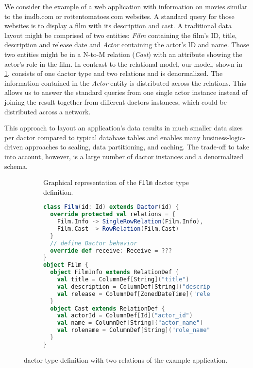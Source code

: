     We consider the example of a web application with information on movies similar to the imdb.com or rottentomatoes.com websites.
    A standard query for those websites is to display a film with its description and cast.
    A traditional data layout might be comprised of two entities: \textit{Film} containing the film's ID, title, description and release date and \textit{Actor} containing the actor's ID and name.
    Those two entities might be in a N-to-M relation (\textit{Cast}) with an attribute showing the actor's role in the film.
    In contrast to the relational model, our model, shown in \cref{fig:film_diagram}, consists of one \gls{dactor} type and two \glspl{relation} and is denormalized.
    The information contained in the \textit{Actor} entity is distributed across the  \glspl{relation}.
    This allows us to answer the standard queries from one single actor instance instead of joining the result together from different \glspl{dactor} instances, which could be distributed across a network.

    This approach to layout an application's data results in much smaller data sizes per \gls{dactor} compared to typical database tables and enables many business-logic-driven approaches to scaling, data partitioning, and caching.
    The trade-off to take into account, however, is a large number of \gls{dactor} instances and a denormalized schema.

    \begin{figure}
      \centering

      \begin{subfigure}[b]{0.44\textwidth}
        \centering
        
        \caption{Graphical representation of the \texttt{Film} \gls{dactor} type definition.}
        \label{fig:film_diagram}
      \end{subfigure}\hfill
      \begin{subfigure}[b]{0.54\textwidth}
        \centering
        \scriptsize
\begin{lstlisting}[language=Scala]
class Film(id: Id) extends Dactor(id) {
  override protected val relations = {
    Film.Info -> SingleRowRelation(Film.Info),
    Film.Cast -> RowRelation(Film.Cast)
  }
  // define Dactor behavior
  override def receive: Receive = ???
}
object Film {
  object FilmInfo extends RelationDef {
    val title = ColumnDef[String]("title")
    val description = ColumnDef[String]("description")
    val release = ColumnDef[ZonedDateTime]("release")
  }
  object Cast extends RelationDef {
    val actorId = ColumnDef[Id]("actor_id")
    val name = ColumnDef[String]("actor_name")
    val rolename = ColumnDef[String]("role_name")
  }
}
\end{lstlisting}
        \label{lst:film_definition}
      \end{subfigure}
      \caption[\texttt{Film} Dactor type definition with two relations of the example application.]{ \gls{dactor} type definition with two relations of the example application.}
      \label{fig:film_dactor_definition}
    \end{figure}


